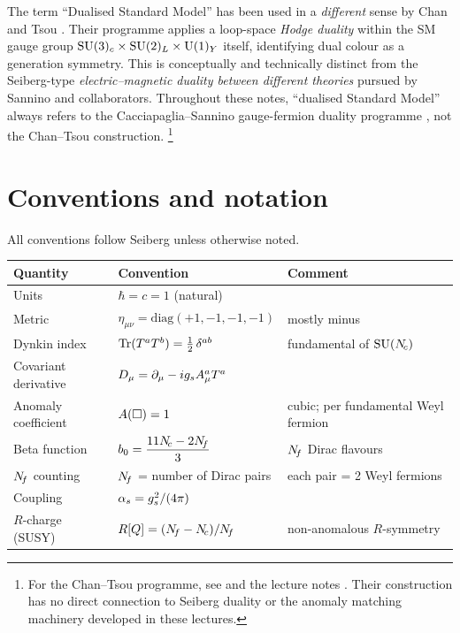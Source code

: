 \documentclass[11pt,a4paper]{article}
\begin{document}
\begin{remark}
\label{rem:chantsou}
The term ``Dualised Standard Model'' has been used in a \emph{different}
sense by Chan and Tsou \cite{ChanTsou1999,Tsou2001}.  Their programme
applies a loop-space \emph{Hodge duality} within the SM gauge group
$\mathrm{SU}(3)_c \times \mathrm{SU}(2)_L \times \mathrm{U}(1)_Y$ itself, identifying dual
colour as a generation symmetry.  This is conceptually and technically
distinct from the Seiberg-type \emph{electric--magnetic duality between
different theories} pursued by Sannino and collaborators.  Throughout
these notes, ``dualised Standard Model'' always refers to the
Cacciapaglia--Sannino gauge-fermion duality programme
\cite{Sannino2024}, not the Chan--Tsou construction.%
\footnote{For the Chan--Tsou programme, see \cite{ChanTsou1999} and the
  lecture notes \cite{Tsou2001}.  Their construction has no direct
  connection to Seiberg duality or the anomaly matching machinery
  developed in these lectures.}
\end{remark}


\section{Conventions and notation}
\label{sec:conventions}

All conventions follow Seiberg \cite{Seiberg1995} unless otherwise noted.

\begin{conventionbox}[title={Conventions for these lecture notes}]
\renewcommand{\arraystretch}{1.3}
\begin{tabular}{@{}l l l@{}}
\toprule
\textbf{Quantity} & \textbf{Convention} & \textbf{Comment} \\
\midrule
Units & $\hbar = c = 1$ (natural) & \\
Metric & $\eta_{\mu\nu} = \mathrm{diag}(+1,-1,-1,-1)$ & mostly minus \\
Dynkin index & $\mathrm{Tr}(T^a T^b) = \tfrac{1}{2}\, \delta^{ab}$ & fundamental of $\mathrm{SU}(N_{\!c})$ \\
Covariant derivative & $D_\mu = \partial_\mu - ig_s A_\mu^a T^a$ & \\
Anomaly coefficient & $A(\square) = 1$ & cubic; per fundamental Weyl fermion \\
Beta function & $b_0 = \dfrac{11N_{\!c} - 2N_{\!f}}{3}$ & $N_{\!f}$ Dirac flavours \\
$N_{\!f}$ counting & $N_{\!f}$ = number of Dirac pairs & each pair = 2 Weyl fermions \\
Coupling & $\alpha_s = g_s^2/(4\pi)$ & \\
$R$-charge (SUSY) & $R[Q] = (N_{\!f} - N_{\!c})/N_{\!f}$ & non-anomalous $R$-symmetry \\
\bottomrule
\end{tabular}
\end{conventionbox}
\end{document}
